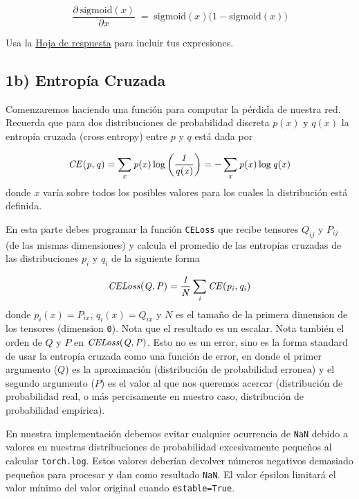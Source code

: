 \documentclass[11pt]{article}
\begin{document}
\begin{equation}
\frac{\partial\ \text{sigmoid}(x)}{\partial x}\; =\; \text{sigmoid}(x)\big(1 - \text{sigmoid}(x)\big)
\end{equation}

Usa la
\href{https://colab.research.google.com/drive/1a44G8JIfuaAXmare28dCDT1gvUV1CuDP}{Hoja
de respuesta} para incluir tus expresiones.

    \hypertarget{b-entropuxeda-cruzada}{%
\subsection{1b) Entropía Cruzada}\label{b-entropuxeda-cruzada}}

Comenzaremos haciendo una función para computar la pérdida de nuestra
red. Recuerda que para dos distribuciones de probabilidad discreta
\(p(x)\) y \(q(x)\) la entropía cruzada (cross entropy) entre \(p\) y
\(q\) está dada por

\begin{equation}
\it{CE}(p,q)=\sum_{x}p(x)\log \bigg(\frac{1}{q(x)}\bigg)=- \sum_{x}p(x)\log q(x)
\end{equation} donde \(x\) varía sobre todos los posibles valores para
los cuales la distribución está definida.

En esta parte debes programar la función \texttt{CELoss} que recibe
tensores \(Q_{ij}\) y \(P_{ij}\) (de las mismas dimensiones) y calcula
el promedio de las entropías cruzadas de las distribuciones \(p_i\) y
\(q_i\) de la siguiente forma

\begin{equation}
\it{CELoss}(Q,P)=\frac{1}{N}\sum_{i}\it{CE}(p_{i}, q_{i})
\end{equation} donde \(p_i(x)=P_{ix}\), \(q_i(x)=Q_{ix}\) y \(N\) es el
tamaño de la primera dimension de los tensores (dimension \texttt{0}).
Nota que el resultado es un escalar. Nota también el orden de \(Q\) y
\(P\) en \(\it{CELoss}(Q,P)\). Esto no es un error, sino es la forma
standard de usar la entropía cruzada como una función de error, en donde
el primer argumento (\(Q\)) es la aproximación (distribución de
probabilidad erronea) y el segundo argumento (\(P\)) es el valor al que
nos queremos acercar (distribución de probabilidad real, o más
percisamente en nuestro caso, distribución de probabilidad empírica).

En nuestra implementación debemos evitar cualquier ocurrencia de
\texttt{NaN} debido a valores en nuestras distribuciones de probabilidad
excesivamente pequeños al calcular \texttt{torch.log}. Estos valores
deberían devolver números negativos demasiado pequeños para procesar y
dan como resultado \texttt{NaN}. El valor épsilon limitará el valor
mínimo del valor original cuando \texttt{estable=True}.
\end{document}

